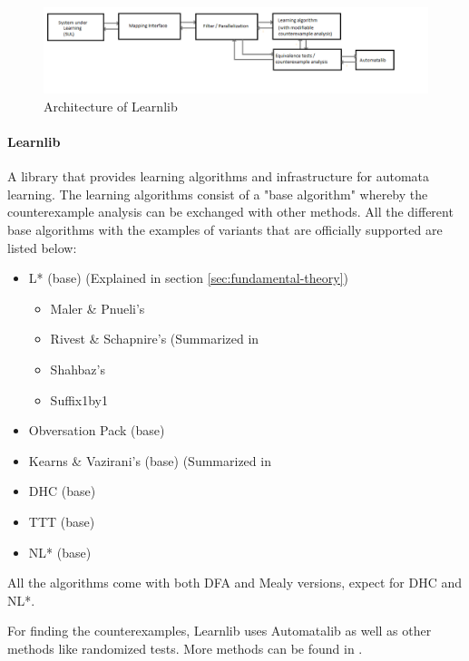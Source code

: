 \documentclass[multi,crop=false,class=article]{standalone}
\begin{document}
\begin{figure}[!ht]
	\includegraphics[width=\textwidth]{Tool_images/learnlib_architecture.png}
	\caption{Architecture of Learnlib}
	\label{fig:learnlib_arch}
\end{figure}

\paragraph{Learnlib} A library that provides learning algorithms and
infrastructure for automata learning. The learning algorithms consist of a "base
algorithm" whereby the counterexample analysis can be exchanged with other
methods. All the different base algorithms with the examples of variants that
are officially supported are listed below:

\begin{itemize}
	\item L* (base) (Explained in section \ref{sec:fundamental-theory})
	\begin{itemize}
		\item Maler \& Pnueli's \cite{Maler1995}
		\item Rivest \& Schapnire's (Summarized in
		\item Shahbaz's \cite{Shahbaz2009}
		\item Suffix1by1 \cite{irfan2010}
	\end{itemize}
	\item Obversation Pack (base) \cite{howar2012a}
	\item Kearns \& Vazirani's (base) (Summarized in
	\item DHC (base) \cite{Merten2012}
	\item TTT (base) %
	\item NL* (base) \cite{Bollig2009}
\end{itemize}

All the algorithms come with both DFA and Mealy versions, expect for DHC and
NL*.

For finding the counterexamples, Learnlib uses Automatalib as well as other
methods like randomized tests. More methods can be found in \cite{Isberner2015}.
\end{document}
